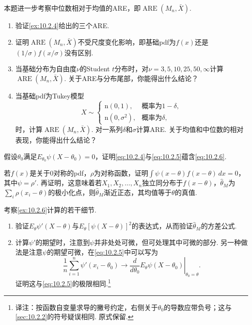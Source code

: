 \begin{exercise}\label{exercise:10.23}
本题进一步考察中位数相对于均值的ARE，即$\operatorname{ARE}(M_n,\bar X)$.
\begin{enumerate}[label=(\alph*)]
\item 验证\autoref{ex:10.2.4}给出的三个ARE.
\item 证明$\operatorname{ARE}(M_n,\bar X)$不受尺度变化影响，即基础pdf为$f(x)$还是$(1/\sigma)f(x/\sigma)$没有区别.
\item 当基础分布为自由度$\nu$的Student $t$分布时，对$\nu=3,5,10,25,50,\infty$计算$\operatorname{ARE}(M_n,\bar X)$. 关于ARE与分布尾部，你能得出什么结论？
\item 当基础pdf为Tukey模型
$$X\sim\begin{cases}\mathrm n(0,1),&\text{概率为$1-\delta$},\\\mathrm n(0,\sigma^2),&\text{概率为$\delta$},\end{cases}$$
时，计算$\operatorname{ARE}(M_n,\bar X)$. 对一系列$\delta$和$\sigma$计算ARE. 关于均值和中位数的相对表现，你能得出什么结论？
\end{enumerate}
\end{exercise}

\begin{exercise}\label{exercise:10.24}
假设$\theta_0$满足$E_{\theta_0}\psi(X-\theta_0)=0$，证明\eqref{eq:10.2.4}与\eqref{eq:10.2.5}蕴含\eqref{eq:10.2.6}.
\end{exercise}

\begin{exercise}\label{exercise:10.25}
若$f(x)$是关于0对称的pdf，$\rho$为对称函数，证明$\int\psi(x-\theta)f(x-\theta)\,dx=0$，其中$\psi=\rho'$. 再证明，这意味着若$X_1,X_2,\ldots,X_n$独立同分布于$f(x-\theta)$，$\hat\theta_M$为$\sum_i\rho(x_i-\theta)$的极小化点，则$\hat\theta_M$渐近正态，其均值等于$\theta$的真值.
\end{exercise}

\begin{exercise}\label{exercise:10.26}
考察\autoref{ex:10.2.6}计算的若干细节.
\begin{enumerate}[label=(\alph*)]
\item 验证$E_\theta\psi'(X-\theta)$与$E_\theta[\psi(X-\theta)]^2$的表达式，从而验证$\hat\theta_M$的方差公式.
\item 计算$\psi'$的期望时，注意到$\psi$并非处处可微，但可处理其中可微的部分. 另一种做法是注意$\psi$的期望可微，在\eqref{eq:10.2.5}中可以写为
$$\frac1n\sum_{i=1}^n\psi'(x_i-\theta_0)\longrightarrow\left.\frac d{d\theta_0}E_\theta\psi(X-\theta_0)\right|_{\theta_0=\theta}.$$
证明这与\eqref{eq:10.2.5}的极限相同.\footnote{译注：按函数自变量求导的撇号约定，右侧关于$\theta_0$的导数应带负号；这与\autoref{sec:10.2.2}的符号疑误相同. 原式保留.}
\end{enumerate}
\end{exercise}

